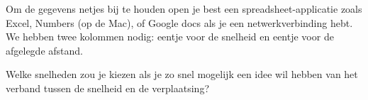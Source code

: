 \documentclass{article}
\begin{document}
Om de gegevens netjes bij te houden open je best een spreadsheet-applicatie zoals Excel, Numbers (op de Mac), of Google
docs als je een netwerkverbinding hebt. We hebben twee kolommen nodig: eentje voor de snelheid en eentje voor de afgelegde
afstand.

Welke snelheden zou je kiezen als je zo snel mogelijk een idee wil hebben van het verband tussen de snelheid
en de verplaatsing?
\end{document}
